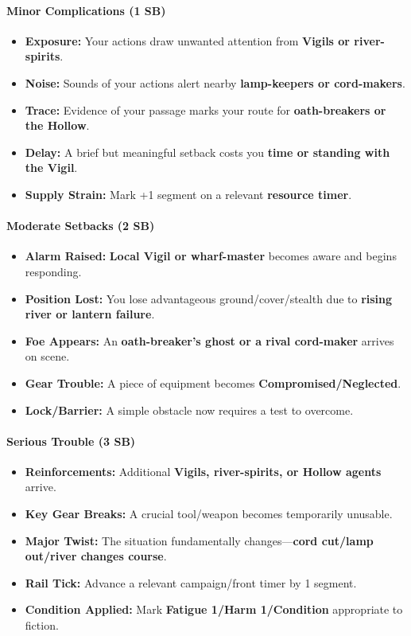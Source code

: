 \paragraph{Minor Complications (1 SB)}
\begin{itemize}
\item \textbf{Exposure:} Your actions draw unwanted attention from \textbf{Vigils or river-spirits}.
\item \textbf{Noise:} Sounds of your actions alert nearby \textbf{lamp-keepers or cord-makers}.
\item \textbf{Trace:} Evidence of your passage marks your route for \textbf{oath-breakers or the Hollow}.
\item \textbf{Delay:} A brief but meaningful setback costs you \textbf{time or standing with the Vigil}.
\item \textbf{Supply Strain:} Mark +1 segment on a relevant \textbf{resource timer}.
\end{itemize}

\paragraph{Moderate Setbacks (2 SB)}
\begin{itemize}
\item \textbf{Alarm Raised:} \textbf{Local Vigil or wharf-master} becomes aware and begins responding.
\item \textbf{Position Lost:} You lose advantageous ground/cover/stealth due to \textbf{rising river or lantern failure}.
\item \textbf{Foe Appears:} An \textbf{oath-breaker's ghost or a rival cord-maker} arrives on scene.
\item \textbf{Gear Trouble:} A piece of equipment becomes \textbf{Compromised/Neglected}.
\item \textbf{Lock/Barrier:} A simple obstacle now requires a test to overcome.
\end{itemize}

\paragraph{Serious Trouble (3 SB)}
\begin{itemize}
\item \textbf{Reinforcements:} Additional \textbf{Vigils, river-spirits, or Hollow agents} arrive.
\item \textbf{Key Gear Breaks:} A crucial tool/weapon becomes temporarily unusable.
\item \textbf{Major Twist:} The situation fundamentally changes---\textbf{cord cut/lamp out/river changes course}.
\item \textbf{Rail Tick:} Advance a relevant campaign/front timer by 1 segment.
\item \textbf{Condition Applied:} Mark \textbf{Fatigue 1/Harm 1/Condition} appropriate to fiction.
\end{itemize}

